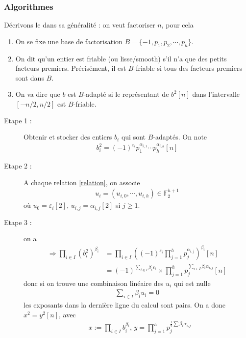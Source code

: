             \subsubsection{Algorithmes} 
                Décrivons le dans sa généralité : on veut factoriser $n$, pour cela
                \begin{enumerate}
                    \item On se fixe une base de factorisation $B = \{-1, p_1, p_2, \cdots, p_h\}$. 
                    \item On dit qu'un entier est friable (ou lisse/smooth) s'il n'a que des petits facteurs premiers. Précisément, il est $B$-friable si tous des facteurs premiers sont dans $B$.
                    \item On va dire que $b$ est $B$-adapté si le représentant de $b^2[n]$ dans l'intervalle $[-n/2, n/2]$ est $B$-friable. 
                \end{enumerate}
                \begin{description}
                    \item[Etape 1 :] Obtenir et stocker des entiers $b_i$ qui sont $B$-adaptés. On note
                    \begin{align}
                        \label{relation}
                        b_i^2 = (-1)^{\varepsilon_i} p_1^{\alpha_{i,1}} \cdots p_h^{\alpha_{i,h}} [n]
                    \end{align}
                    \item[Etape 2 :] A chaque relation  \ref{relation}, on associe 
                    \begin{align*}
                        u_i = (u_{i, 0}, \cdots, u_{i,h}) \in \mathbb{F}_2^{h + 1}
                    \end{align*}
                    où $u_0 = \varepsilon_i [2]$, $u_{i,j} = \alpha_{i,j} [2]$ si $j \geq 1$.
                    \item[Etape 3 : ] on a
                    \begin{align*}
                        \Rightarrow \prod_{i \in I} (b_i^2)^{\beta_i} &= \prod_{i \in I} \left( (-1)^{\varepsilon_i} \prod_{j = 1}^h p_j^{\alpha_{i,j}} \right)^{\beta_i} [n] \\
                        &= (-1)^{\sum_{i \in I} \beta_i \varepsilon_i} \times \prod_{j = 1}^h p_j^{\sum_{i \in I} \beta_i \alpha_{i, j}} [n]
                    \end{align*}
                    donc si on trouve une combinaison linéaire des $u_i$ qui est nulle
                    \begin{align*}
                        \sum_{i \in I} \beta_i u_i = 0
                    \end{align*}
                    les exposants dans la dernière ligne du calcul sont pairs. On a donc $x^2 = y^2 [n]$, avec 
                    \begin{align*}
                        &x := \prod_{i \in I} b_i^{\beta_i} ,\, y = \prod_{j = 1}^h p_j^{\frac12 \sum \beta_i \alpha_{i,j}}
                    \end{align*}
                \end{description}

